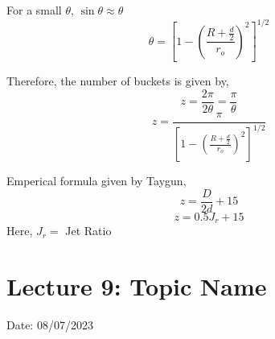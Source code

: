 \documentclass{article}
\begin{document}
\begin{enumerate}
For a small $\theta$, $\sin \theta \approx \theta $
$$\theta = \left[1- \left(\frac{R + \frac{d}{2}}{r_o}\right)^2\right]^{1/2} $$

Therefore, the number of buckets is given by, $$z = \frac{2\pi}{2\theta} = \frac{\pi}{\theta}$$
\begin{equation}
  z = \frac{\pi}{\left[1- \left(\frac{R + \frac{d}{2}}{r_o}\right)^2\right]^{1/2}}
\end{equation}

Emperical formula given by Taygun,
$$z = \frac{D}{2d} + 15$$
\begin{equation}
  z = 0.5 J_r + 15  
\end{equation}
Here, $J_r = $ Jet Ratio 
\end{enumerate}

\vspace*{1cm}

\section{Lecture 9: Topic Name}
\hfill Date: 08/07/2023
\end{document}
